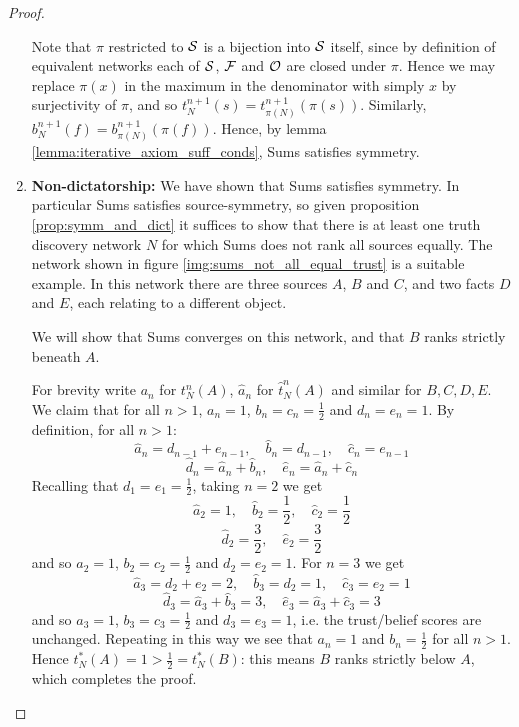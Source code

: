 \documentclass[../main.tex]{subfiles}
\begin{document}
\begin{proof}
\begin{enumerate}
Note that $\pi$ restricted to $\S$ is a bijection into $\S$ itself, since
by definition of equivalent networks each of $\S$, $\F$ and $\O$ are closed
under $\pi$. Hence we may replace $\pi(x)$ in the maximum in the denominator
with simply $x$ by surjectivity of $\pi$, and so
$t_N^{n+1}(s)=t_{\pi(N)}^{n+1}(\pi(s))$. Similarly,
$b_N^{n+1}(f)=b_{\pi(N)}^{n+1}(\pi(f))$. Hence, by lemma
\ref{lemma:iterative_axiom_suff_conds}, Sums satisfies symmetry.

\item\textbf{Non-dictatorship:} We have shown that Sums satisfies symmetry. In
particular Sums satisfies source-symmetry, so given proposition
\ref{prop:symm_and_dict} it suffices to show that there is at least one
truth discovery network $N$ for which Sums does not rank all sources equally.
The network shown in figure \ref{img:sums_not_all_equal_trust} is a suitable
example. In this network there are three sources $A$, $B$ and $C$, and two
facts $D$ and $E$, each relating to a different object\footnotemark{}.


We will show that Sums converges on this network, and that $B$ ranks strictly
beneath $A$.

For brevity write $a_n$ for $t_N^n(A)$, $\hat{a}_n$ for $\hat{t}_N^n(A)$
and similar for $B, C, D, E$. We claim that for all $n > 1$, $a_n = 1$, $b_n =
c_n = \frac{1}{2}$ and $d_n = e_n = 1$. By definition, for all $n > 1$:
\[
    \hat{a}_n  = d_{n-1} + e_{n-1}, \quad
    \hat{b}_n  = d_{n-1}, \quad
    \hat{c}_n  = e_{n-1}
\]
\[
    \hat{d}_n  = \hat{a}_n + \hat{b}_n, \quad
    \hat{e}_n  = \hat{a}_n + \hat{c}_n
\]
Recalling that $d_1 = e_1 = \frac{1}{2}$, taking $n=2$ we get
\[
    \hat{a}_2  = 1, \quad
    \hat{b}_2  = \frac{1}{2}, \quad
    \hat{c}_2  = \frac{1}{2}
\]
\[
    \hat{d}_2  = \frac{3}{2}, \quad
    \hat{e}_2  = \frac{3}{2}
\]
and so $a_2 = 1$, $b_2 = c_2 = \frac{1}{2}$ and $d_2 = e_2 = 1$. For $n = 3$ we
get
\[
    \hat{a}_3  = d_2 + e_2 = 2, \quad
    \hat{b}_3  = d_2 = 1, \quad
    \hat{c}_3  = e_2 = 1
\]
\[
    \hat{d}_3  = \hat{a}_3 + \hat{b}_3 = 3, \quad
    \hat{e}_3  = \hat{a}_3 + \hat{c}_3 = 3
\]
and so $a_3 = 1$, $b_3 = c_3 = \frac{1}{2}$ and $d_3 = e_3 = 1$, i.e. the
trust/belief scores are unchanged. Repeating in this way we see that $a_n = 1$
and $b_n = \frac{1}{2}$ for all $n > 1$. Hence $t_N^*(A) = 1 > \frac{1}{2} =
t_N^*(B)$: this means $B$ ranks strictly below $A$, which completes the proof.


\end{enumerate}
\end{proof}
\end{document}
